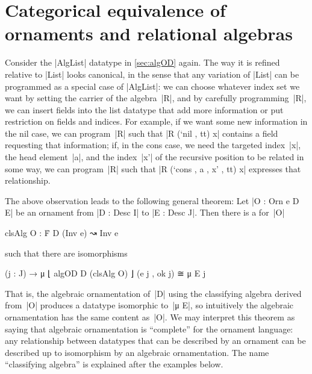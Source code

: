 \chapter{Categorical equivalence of ornaments and relational algebras}
\label{chap:equivalence}

Consider the |AlgList| datatype in \autoref{sec:algOD} again.
The way it is refined relative to |List| looks canonical, in the sense that any variation of |List| can be programmed as a special case of |AlgList|:
we can choose whatever index set we want by setting the carrier of the algebra~|R|, and by carefully programming~|R|, we can insert fields into the list datatype that add more information or put restriction on fields and indices.
For example, if we want some new information in the nil case, we can program~|R| such that |R (`nil , tt) x| contains a field requesting that information; if, in the cons case, we need the targeted index~|x|, the head element~|a|, and the index~|x'| of the recursive position to be related in some way, we can program~|R| such that |R (`cons , a , x' , tt) x| expresses that relationship.

The above observation leads to the following general theorem:
Let |O : Orn e D E| be an ornament from |D : Desc I| to |E : Desc J|.
Then there is a  for~|O|
\begin{code}
clsAlg O : Ḟ D (Inv e) ↝ Inv e
\end{code}
such that there are isomorphisms
\begin{code}
(j : J) → μ ⌊ algOD D (clsAlg O) ⌋ (e j , ok j) ≅ μ E j
\end{code}
That is, the algebraic ornamentation of~|D| using the classifying algebra derived from~|O| produces a datatype isomorphic to~|μ E|, so intuitively the algebraic ornamentation has the same content as~|O|.
We may interpret this theorem as saying that algebraic ornamentation is ``complete'' for the ornament language: any relationship between datatypes that can be described by an ornament can be described up to isomorphism by an algebraic ornamentation.
The name ``classifying algebra'' is explained after the examples below.

